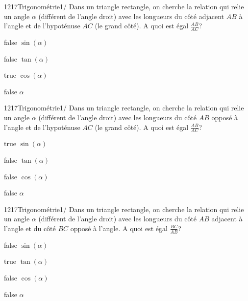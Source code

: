         	\begin{question}{1217}{Trigonométrie}{1}{/}
				Dans un triangle rectangle, on cherche la relation qui relie un angle $\alpha$ (différent de l'angle droit) avec les longueurs du côté adjacent $AB$ à l'angle et de l'hypoténuse $AC$ (le grand côté). A quoi est égal $\frac{AB}{AC}$?
            \end{question}
            \begin{reponses}
            	\item[false] $\sin(\alpha)$
            	\item[false] $\tan(\alpha)$
                \item[true] $\cos(\alpha)$
                \item[false] $\alpha$
            \end{reponses}
        	\begin{question}{1217}{Trigonométrie}{1}{/}
				Dans un triangle rectangle, on cherche la relation qui relie un angle $\alpha$ (différent de l'angle droit) avec les longueurs du côté $AB$ opposé à l'angle et de l'hypoténuse $AC$ (le grand côté). A quoi est égal $\frac{AB}{AC}$?
            \end{question}
            \begin{reponses}
            	\item[true] $\sin(\alpha)$
            	\item[false] $\tan(\alpha)$
                \item[false] $\cos(\alpha)$
                \item[false] $\alpha$
            \end{reponses}
        	\begin{question}{1217}{Trigonométrie}{1}{/}
				Dans un triangle rectangle, on cherche la relation qui relie un angle $\alpha$ (différent de l'angle droit) avec les longueurs du côté $AB$ adjacent à l'angle et du côté $BC$ opposé à l'angle. A quoi est égal $\frac{BC}{AB}$?
            \end{question}
            \begin{reponses}
            	\item[false] $\sin(\alpha)$
                \item[true] $\tan(\alpha)$
                \item[false] $\cos(\alpha)$
            	\item[false] $\alpha$
            \end{reponses}
